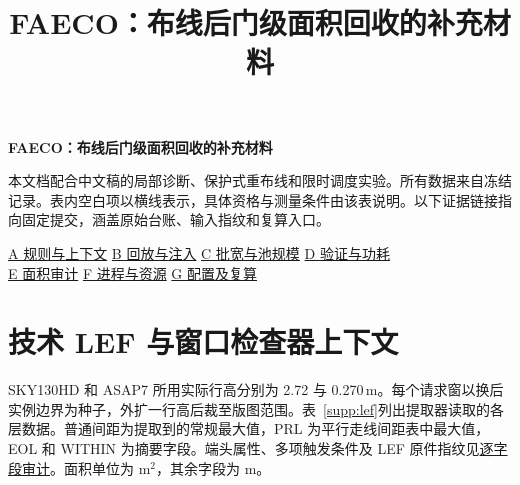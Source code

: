 \documentclass[10pt,a4paper,fontset=windows]{ctexart}
\title{FAECO：布线后门级面积回收的补充材料}
\author{}
\date{}
\newcommand{\Evidence}[2]{\href{https://github.com/Toylog123/FAECO/blob/f0fe992b9ce44b8368b620d06b8d95a56179347c/project_docs/evidence/#1}{#2}}
\newcommand{\Vfive}[2]{\Evidence{tcad_v5_revision_20261126/#1}{#2}}
\begin{document}
\begin{center}\LARGE\bfseries FAECO：布线后门级面积回收的补充材料\end{center}
本文档配合中文稿的局部诊断、保护式重布线和限时调度实验。所有数据来自冻结记录。表内空白项以横线表示，具体资格与测量条件由该表说明。以下证据链接指向固定提交，涵盖原始台账、输入指纹和复算入口。
\begin{center}\small
\hyperref[sec:A]{A 规则与上下文}\quad
\hyperref[sec:B]{B 回放与注入}\quad
\hyperref[sec:C]{C 批宽与池规模}\quad
\hyperref[sec:D]{D 验证与功耗}\\
\hyperref[sec:E]{E 面积审计}\quad
\hyperref[sec:F]{F 进程与资源}\quad
\hyperref[sec:G]{G 配置及复算}
\end{center}

\appendix
\section{技术 LEF 与窗口检查器上下文}\label{sec:A}

SKY130HD 和 ASAP7 所用实际行高分别为 2.72 与 0.270\,\textmu m。每个请求窗以换后实例边界为种子，外扩一行高后裁至版图范围。表~\ref{supp:lef}列出提取器读取的各层数据。普通间距为提取到的常规最大值，PRL 为平行走线间距表中最大值，EOL 和 WITHIN 为摘要字段。端头属性、多项触发条件及 LEF 原件指纹见\Vfive{WINDOW_RULE_SCOPE.md}{逐字段审计}。面积单位为 \textmu m$^2$，其余字段为 \textmu m。
\end{document}
